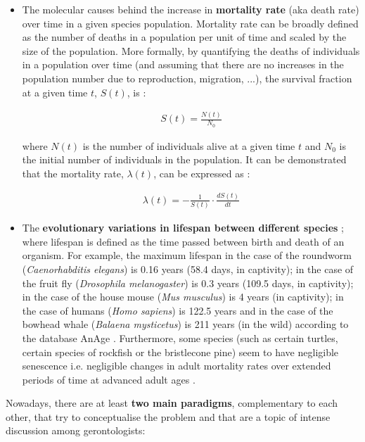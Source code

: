 \begin{itemize}
	
	\item The molecular causes behind the increase in \textbf{mortality rate} (aka death rate) over time in a given species population. Mortality rate can be broadly defined as the number of deaths in a population per unit of time and scaled by the size of the population. More formally, by quantifying the deaths of individuals in a population over time (and assuming that there are no increases in the population number due to reproduction, migration, ...), the survival fraction at a given time $t$, $S(t)$, is \cite{Witten1986}:
	
	\begin{align}
	S(t) = \frac{N(t)}{N_0}
	\end{align}
	
	where $N(t)$ is the number of individuals alive at a given time $t$ and $N_0$ is the initial number of individuals in the population. It can be demonstrated that the mortality rate, $\lambda(t)$, can be expressed as \cite{Witten1986}:
	
	\begin{align} \label{eq:1.2}
	\lambda(t) = - \frac{1}{S(t)} \cdot \frac{dS(t)}{dt}
	\end{align}
	
	\item The \textbf{evolutionary variations in lifespan between different species} \cite{Jones2013}; where lifespan is defined as the time passed between birth and death of an organism. For example, the maximum lifespan in the case of the roundworm (\textit{Caenorhabditis elegans}) is 0.16 years (58.4 days, in captivity); in the case of the fruit fly (\textit{Drosophila melanogaster}) is 0.3 years (109.5 days, in captivity); in the case of the house mouse (\textit{Mus musculus}) is 4 years (in captivity); in the case of humans (\textit{Homo sapiens}) is 122.5 years and in the case of the bowhead whale (\textit{Balaena mysticetus}) is 211 years (in the wild) according to the database AnAge \cite{DEMAGALHAES2009}. Furthermore, some species (such as certain turtles, certain species of rockfish or the bristlecone pine) seem to have negligible senescence i.e. negligible changes in adult mortality rates over extended periods of time at advanced adult ages \cite{Finch2009}.   
	
\end{itemize}

Nowadays, there are at least \textbf{two main paradigms}, complementary to each other, that try to conceptualise the problem and that are a topic of intense discussion among gerontologists:

